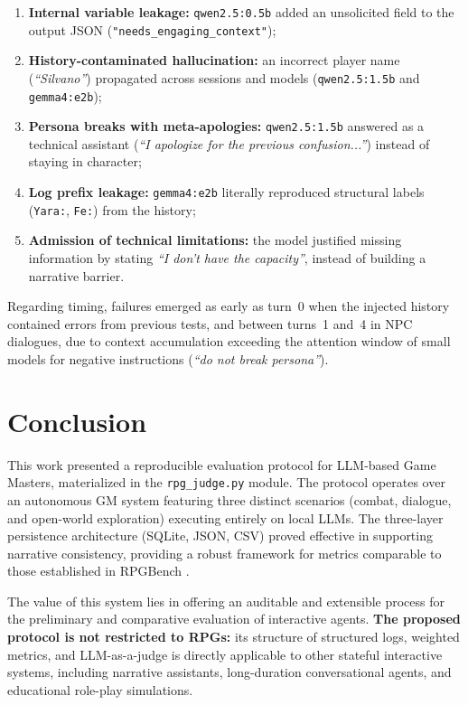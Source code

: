 \documentclass[12pt]{article}
\begin{document}
\begin{enumerate}[label=(\roman*),leftmargin=2.4em,itemsep=2pt]
  \item \textbf{Internal variable leakage:} \texttt{qwen2.5:0.5b} added an unsolicited field to the output JSON (\texttt{"needs\_engaging\_context"});
  \item \textbf{History-contaminated hallucination:} an incorrect player name (\textit{``Silvano''}) propagated across sessions and models (\texttt{qwen2.5:1.5b} and \texttt{gemma4:e2b});
  \item \textbf{Persona breaks with meta-apologies:} \texttt{qwen2.5:1.5b} answered as a technical assistant (\textit{``I apologize for the previous confusion...''}) instead of staying in character;
  \item \textbf{Log prefix leakage:} \texttt{gemma4:e2b} literally reproduced structural labels (\texttt{Yara:}, \texttt{Fe:}) from the history;
  \item \textbf{Admission of technical limitations:} the model justified missing information by stating \textit{``I don't have the capacity''}, instead of building a narrative barrier.
\end{enumerate}

Regarding timing, failures emerged as early as turn~0 when the injected history contained errors from previous tests, and between turns~1 and~4 in NPC dialogues, due to context accumulation exceeding the attention window of small models for negative instructions (\textit{``do not break persona''}).

\section{Conclusion}

This work presented a reproducible evaluation protocol for LLM-based Game Masters, materialized in the \texttt{rpg\_judge.py} module. The protocol operates over an autonomous GM system featuring three distinct scenarios (combat, dialogue, and open-world exploration) executing entirely on local LLMs. The three-layer persistence architecture (SQLite, JSON, CSV) proved effective in supporting narrative consistency, providing a robust framework for metrics comparable to those established in RPGBench \cite{yu:2025}.

The value of this system lies in offering an auditable and extensible process for the preliminary and comparative evaluation of interactive agents. \textbf{The proposed protocol is not restricted to RPGs:} its structure of structured logs, weighted metrics, and LLM-as-a-judge is directly applicable to other stateful interactive systems, including narrative assistants, long-duration conversational agents, and educational role-play simulations.
\end{document}
